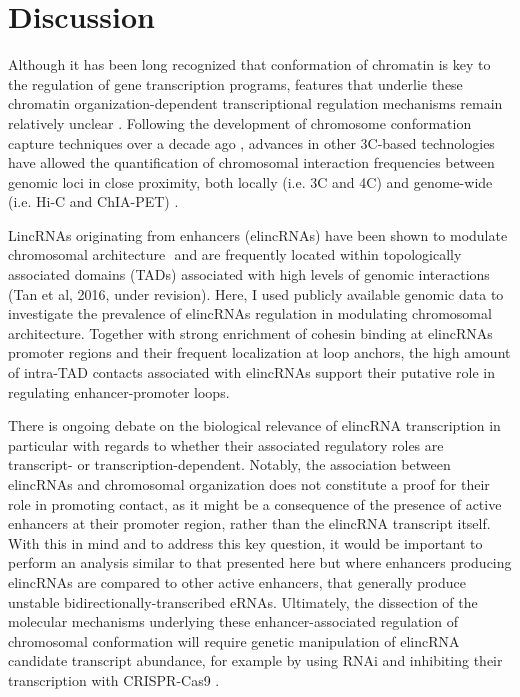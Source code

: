 \documentclass[11pt,a4paper]{report}
\begin{document}
\section*{Discussion}

Although it has been long recognized that conformation of chromatin is key to the regulation of gene transcription programs, features that underlie these chromatin organization-dependent transcriptional regulation mechanisms remain relatively unclear \cite{Bonev2016}⁠. Following the development of chromosome conformation capture techniques over a decade ago \cite{Dekker2002}⁠, advances in other 3C-based technologies have allowed the quantification of chromosomal interaction frequencies between genomic loci in close proximity, both locally (i.e. 3C and 4C) and genome-wide (i.e. Hi-C and ChIA-PET) \cite{Dekker2013}.

LincRNAs originating from enhancers (elincRNAs) have been shown to modulate chromosomal architecture \cite{Yin2015}⁠ and are frequently located within topologically associated domains (TADs) associated with high levels of genomic interactions (Tan et al, 2016, under revision). Here, I used publicly available genomic data to investigate the prevalence of elincRNAs regulation in modulating chromosomal architecture. Together with strong enrichment of cohesin binding at elincRNAs promoter regions and their frequent localization at loop anchors, the high amount of intra-TAD contacts associated with elincRNAs support their putative role in regulating enhancer-promoter loops. 

There is ongoing debate on the biological relevance of elincRNA transcription in particular with regards to  whether their associated regulatory roles are transcript- or transcription-dependent. Notably, the association between elincRNAs and chromosomal organization does not constitute a proof for their role in promoting contact, as it might be a consequence of the presence of active enhancers at their promoter region, rather than the elincRNA transcript itself. With this in mind and to address this key question, it would be important to perform an analysis similar to that presented here but where enhancers producing elincRNAs are compared to other active enhancers, that generally produce unstable bidirectionally-transcribed eRNAs. Ultimately, the dissection of the molecular mechanisms underlying these enhancer-associated regulation of chromosomal conformation will require genetic manipulation of elincRNA candidate transcript abundance, for example by using RNAi and inhibiting their transcription with CRISPR-Cas9 \cite{Li2013}⁠.
\end{document}
